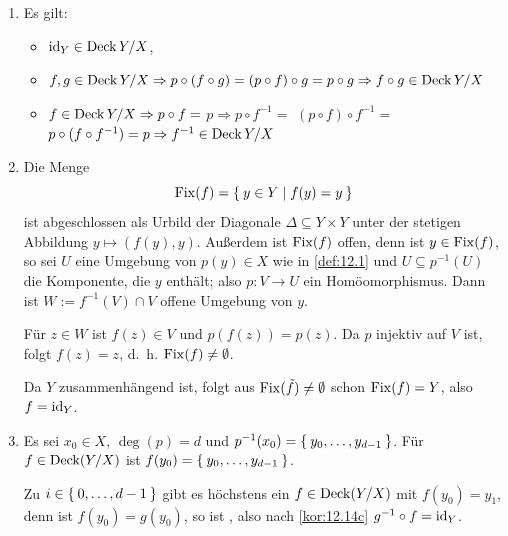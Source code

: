 \begin{beweis}\leavevmode
    \begin{enumerate}[label=\alph*)]
        \item Es gilt:
            \begin{itemize}
                \item $\textnormal{id}_Y \in \operatorname{Deck}{Y/X}$,
                \item $f,g \in \operatorname{Deck}{Y/X} \Rightarrow p \circ (f \circ g) = (p \circ f) \circ g = p \circ g \Rightarrow f \circ g \in \operatorname{Deck}{Y/X}$
                \item $f \in \operatorname{Deck}{Y/X} \Rightarrow p \circ f =$
                      $p \Rightarrow p \circ f^{-1} =$
                      $(p \circ f) \circ f^{-1} =$
                      $p \circ (f \circ f^{-1}) = p \Rightarrow f^{-1} \in \operatorname{Deck}{Y/X}$
            \end{itemize}
        \item Die Menge
              \[\operatorname{Fix}(f) = \Set{y \in Y | f(y) = y}\]
              ist abgeschlossen als Urbild der Diagonale 
              $\Delta \subseteq Y \times Y$ unter der stetigen
              Abbildung $y \mapsto (f(y),y)$. Außerdem ist $\operatorname{Fix}(f)$
              offen, denn ist $y \in \operatorname{Fix}(f)$, so sei $U$ eine 
              Umgebung von $p(y) \in X$ wie in \cref{def:12.1}
              und $U \subseteq p^{-1}(U)$ die Komponente, die $y$
              enthält; also $p:V \rightarrow U$ ein Homöomorphismus.
              Dann ist $W := f^{-1}(V) \cap V$ offene Umgebung von $y$.

              Für $z \in W$ ist $f(z) \in V$ und $p(f(z)) = p(z)$.
              Da $p$ injektiv auf $V$ ist, folgt $f(z) = z$, d.~h.
              $\operatorname{Fix}(f) \neq \emptyset$.

              Da $Y$ zusammenhängend ist, folgt aus $\operatorname{Fix}(\tilde{f}) \neq \emptyset$
              schon $\operatorname{Fix}(f) = Y$, also $f = \textnormal{id}_Y$.
        \item Es sei $x_0 \in X$, $\deg(p) = d$ und $p^{-1}(x_0) = \Set{y_0, \dots, y_{d-1}}$.
              Für $f \in \operatorname{Deck}(Y/X)$ ist $f(y_0)= \Set{y_0, \dots, y_{d-1}}$.

              Zu $i \in \Set{0, \dots, d-1}$ gibt es höchstens ein 
              $f \in \operatorname{Deck}(Y/X)$ mit $f(y_0) = y_1$, denn ist
              $f(y_0) = g(y_0)$, so ist ,
              also nach \cref{kor:12.14c} $g^{-1} \circ f = \textnormal{id}_Y$.
    \end{enumerate}
\end{beweis}

